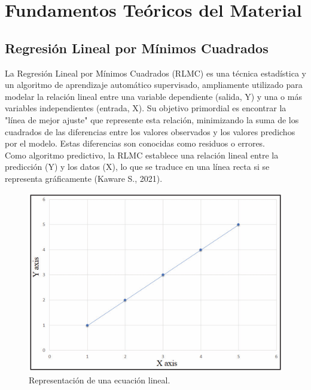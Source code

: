 \documentclass[]{article}
\title{}
\author{}
\begin{document}
\maketitle

\begin{abstract}

\end{abstract}

\section{Fundamentos Teóricos del Material}
	\subsection{Regresión Lineal por Mínimos Cuadrados}
	La Regresión Lineal por Mínimos Cuadrados (RLMC) es una técnica estadística y un algoritmo de aprendizaje automático supervisado, ampliamente utilizado para modelar la relación lineal entre una variable dependiente (salida, Y) y una o más variables independientes (entrada, X). Su objetivo primordial es encontrar la "línea de mejor ajuste" que represente esta relación, minimizando la suma de los cuadrados de las diferencias entre los valores observados y los valores predichos por el modelo. Estas diferencias son conocidas como residuos o errores.\\
	Como algoritmo predictivo, la RLMC establece una relación lineal entre la predicción (Y) y los datos (X), lo que se traduce en una línea recta si se representa gráficamente (Kaware S., 2021).

	\begin{figure}[h]
		\centering
		\includegraphics[width=0.7\linewidth]{imagenes/Imagen1}
		\caption{Representación de una ecuación lineal.}
		\label{fig:Imagen1}
	\end{figure}
	
\end{document}
